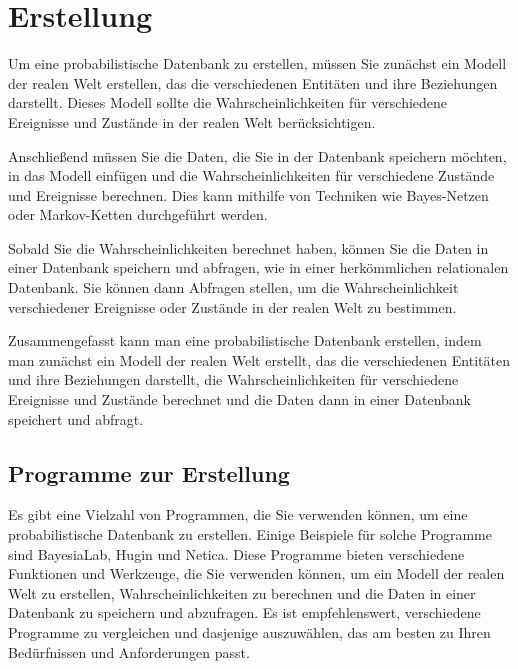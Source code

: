 \chapter{Erstellung}

Um eine probabilistische Datenbank zu erstellen, müssen Sie zunächst ein Modell der realen Welt erstellen, das die verschiedenen Entitäten und ihre Beziehungen darstellt. Dieses Modell sollte die Wahrscheinlichkeiten für verschiedene Ereignisse und Zustände in der realen Welt berücksichtigen.

Anschließend müssen Sie die Daten, die Sie in der Datenbank speichern möchten, in das Modell einfügen und die Wahrscheinlichkeiten für verschiedene Zustände und Ereignisse berechnen. Dies kann mithilfe von Techniken wie Bayes-Netzen oder Markov-Ketten durchgeführt werden.

Sobald Sie die Wahrscheinlichkeiten berechnet haben, können Sie die Daten in einer Datenbank speichern und abfragen, wie in einer herkömmlichen relationalen Datenbank. Sie können dann Abfragen stellen, um die Wahrscheinlichkeit verschiedener Ereignisse oder Zustände in der realen Welt zu bestimmen.

Zusammengefasst kann man eine probabilistische Datenbank erstellen, indem man zunächst ein Modell der realen Welt erstellt, das die verschiedenen Entitäten und ihre Beziehungen darstellt, die Wahrscheinlichkeiten für verschiedene Ereignisse und Zustände berechnet und die Daten dann in einer Datenbank speichert und abfragt.


\section{Programme zur Erstellung}
Es gibt eine Vielzahl von Programmen, die Sie verwenden können, um eine probabilistische Datenbank zu erstellen. Einige Beispiele für solche Programme sind BayesiaLab, Hugin und Netica. Diese Programme bieten verschiedene Funktionen und Werkzeuge, die Sie verwenden können, um ein Modell der realen Welt zu erstellen, Wahrscheinlichkeiten zu berechnen und die Daten in einer Datenbank zu speichern und abzufragen. Es ist empfehlenswert, verschiedene Programme zu vergleichen und dasjenige auszuwählen, das am besten zu Ihren Bedürfnissen und Anforderungen passt.




